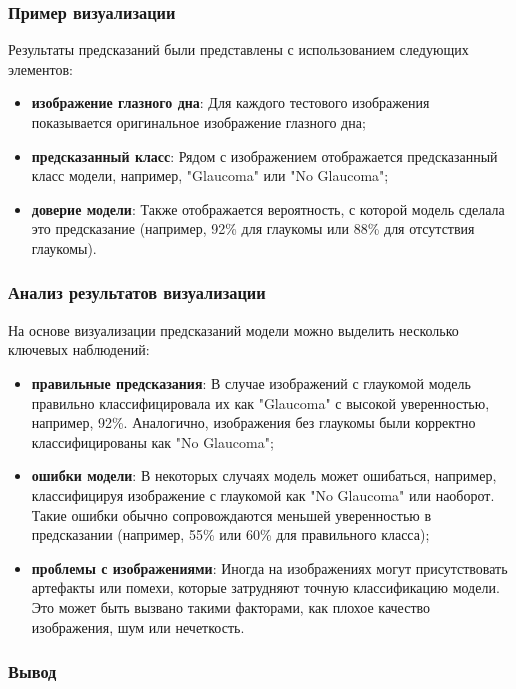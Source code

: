 {    \subsubsection*{Пример визуализации}

    Результаты предсказаний были представлены с использованием следующих элементов:
    \begin{itemize}
        \item \textbf{изображение глазного дна}: Для каждого тестового изображения показывается оригинальное изображение глазного дна;
        \item \textbf{предсказанный класс}: Рядом с изображением отображается предсказанный класс модели, например, "Glaucoma" или "No Glaucoma";
        \item \textbf{доверие модели}: Также отображается вероятность, с которой модель сделала это предсказание (например, 92\% для глаукомы или 88\% для отсутствия глаукомы).
    \end{itemize}

    \subsubsection*{Анализ результатов визуализации}

    На основе визуализации предсказаний модели можно выделить несколько ключевых наблюдений:

    \begin{itemize}
        \item \textbf{правильные предсказания}: В случае изображений с глаукомой модель правильно классифицировала их как "Glaucoma" с высокой уверенностью, например, 92\%. Аналогично, изображения без глаукомы были корректно классифицированы как "No Glaucoma";
        \item \textbf{ошибки модели}: В некоторых случаях модель может ошибаться, например, классифицируя изображение с глаукомой как "No Glaucoma" или наоборот. Такие ошибки обычно сопровождаются меньшей уверенностью в предсказании (например, 55\% или 60\% для правильного класса);
        \item \textbf{проблемы с изображениями}: Иногда на изображениях могут присутствовать артефакты или помехи, которые затрудняют точную классификацию модели. Это может быть вызвано такими факторами, как плохое качество изображения, шум или нечеткость.
    \end{itemize}

    \subsubsection*{Вывод}

}
